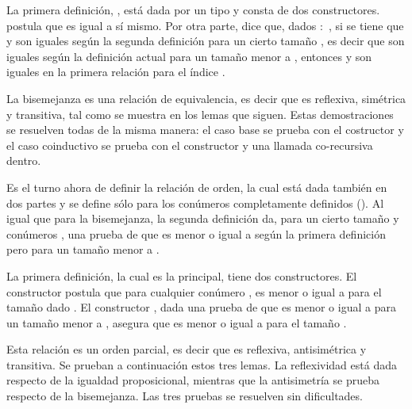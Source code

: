 La primera definición, \AgdaFunction{$[\_]\_\sim\_$}, está dada por un tipo  y consta de dos constructores.  postula que  es igual a sí mismo. Por otra parte,   dice que, dados  $:$ , si se tiene que   y   son iguales según la segunda definición para un cierto tamaño , es decir que son iguales según la definición actual para un tamaño  menor a , entonces   y   son iguales en la primera relación para el índice . 

La bisemejanza es una relación de equivalencia, es decir que es reflexiva, simétrica y transitiva, tal como se muestra en los lemas que siguen. Estas demostraciones se resuelven todas de la misma manera: el caso base se prueba con el costructor  y el caso coinductivo se prueba con el constructor  y una llamada co-recursiva dentro.

Es el turno ahora de definir la relación de orden, la cual está dada también en dos partes y se define sólo para los conúmeros completamente definidos (). Al igual que para la bisemejanza, la segunda definición da, para un cierto tamaño  y conúmeros , una prueba de que  es menor o igual a  según la primera definición pero para un tamaño  menor a . 

La primera definición, la cual es la principal, tiene dos constructores. El constructor  postula que para cualquier conúmero ,  es menor o igual a  para el tamaño dado . El constructor , dada una prueba de que   es menor o igual a   para un tamaño  menor a , asegura que   es menor o igual a   para el tamaño .

Esta relación es un orden parcial, es decir que es reflexiva, antisimétrica y transitiva. Se prueban a continuación estos tres lemas. La reflexividad está dada respecto de la igualdad proposicional, mientras que la antisimetría se prueba respecto de la bisemejanza. Las tres pruebas se resuelven sin dificultades. 

